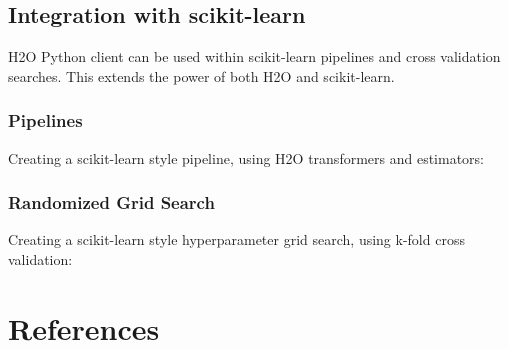 \subsection{Integration with scikit-learn}
H2O Python client can be used within scikit-learn pipelines and cross validation searches.  This extends
 the power of both H2O and scikit-learn.
\subsubsection{Pipelines}

Creating a scikit-learn style pipeline, using H2O transformers and estimators:


\subsubsection{Randomized Grid Search}
Creating a scikit-learn style hyperparameter grid search, using k-fold cross validation:




\newpage
\section{References}







\enddocument